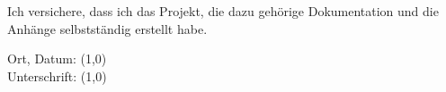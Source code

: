 Ich versichere, dass ich das Projekt, die dazu gehörige Dokumentation und die Anhänge selbstständig erstellt habe.

\vspace{1cm}
Ort, Datum:
\line(1,0){\textwidth}\\
\vspace{1cm}
Unterschrift:
\line(1,0){\textwidth}